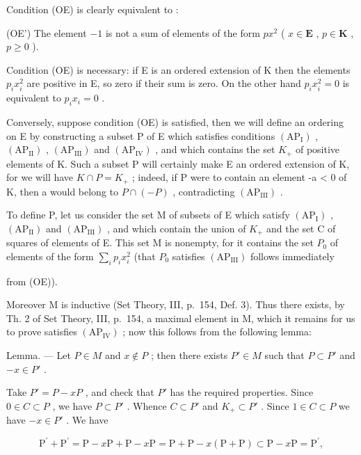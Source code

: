 Condition (OE) is clearly equivalent to :

(OE') The element \(-1\) is not a sum of elements of the form \(px^2\) ( \(x \in \mathbf{E}\) , \(p \in \mathbf{K}\) , \(p \geqslant 0\) ).

Condition (OE) is necessary: if E is an ordered extension of K then the elements \(p_{i}x_{i}^{2}\) are positive in E, so zero if their sum is zero. On the other hand \(p_{i}x_{i}^{2}=0\) is equivalent to \(p_{i}x_{i}=0\) .

Conversely, suppose condition (OE) is satisfied, then we will define an ordering on E by constructing a subset P of E which satisfies conditions \((\mathrm{AP}_{\mathrm{I}})\) , \((\mathrm{AP}_{\mathrm{II}})\) , \((\mathrm{AP}_{\mathrm{III}})\) and \((\mathrm{AP}_{\mathrm{IV}})\) , and which contains the set \(K_{+}\) of positive elements of K. Such a subset P will certainly make E an ordered extension of K, for we will have \(K \cap P = K_{+}\) ; indeed, if P were to contain an element -a \textless{} 0 of K, then a would belong to \(P \cap (-P)\) , contradicting \((\mathrm{AP}_{\mathrm{III}})\) .

To define P, let us consider the set M of subsets of E which satisfy \((\mathrm{AP}_{\mathrm{I}})\) , \((\mathrm{AP}_{\mathrm{II}})\) and \((\mathrm{AP}_{\mathrm{III}})\) , and which contain the union of \(K_{+}\) and the set C of squares of elements of E. This set M is nonempty, for it contains the set \(P_{0}\) of elements of the form \(\sum_{i} p_{i} x_{i}^{2}\) (that \(P_{0}\) satisfies \((\mathrm{AP}_{\mathrm{III}})\) follows immediately

from (OE)).

Moreover M is inductive (Set Theory, III, p.~154, Def. 3). Thus there exists, by Th. 2 of Set Theory, III, p.~154, a maximal element in M, which it remains for us to prove satisfies \((\mathrm{AP}_{\mathrm{IV}})\) ; now this follows from the following lemma:

Lemma. --- Let \(P \in M\) and \(x \notin P\) ; then there exists \(P' \in M\) such that \(P \subset P'\) and \(-x \in P'\) .

Take \(P' = P - xP\) , and check that \(P'\) has the required properties. Since \(0 \in C \subset P\) , we have \(P \subset P'\) . Whence \(C \subset P'\) and \(K_{+} \subset P'\) . Since \(1 \in C \subset P\) we have \(-x \in P'\) . We have

\[
\mathrm{P} ^ {\prime} + \mathrm{P} ^ {\prime} = \mathrm{P} - x \mathrm{P} + \mathrm{P} - x \mathrm{P} = \mathrm{P} + \mathrm{P} - x (\mathrm{P} + \mathrm{P}) \subset \mathrm{P} - x \mathrm{P} = \mathrm{P} ^ {\prime},
\]

